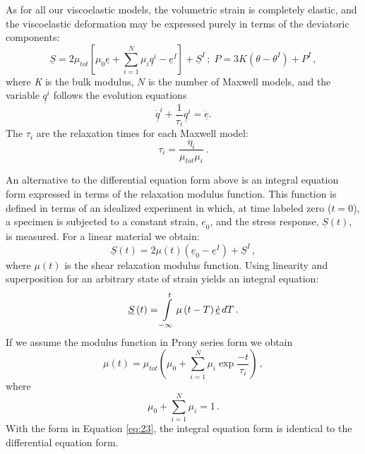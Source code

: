 As for all our viscoelastic models, the volumetric strain is completely
elastic, and the viscoelastic deformation may be expressed purely
in terms of the deviatoric components:
\begin{equation}
\underline{S}=2\mu_{tot}\left[\mu_{0}\underline{e}+\sum_{i=1}^{N}\mu_{i}\underline{q}^{i}-\underline{e}^{I}\right]+\underline{S}^{I}\,;\; P=3K\left(\theta-\theta^{I}\right)+P^{I}\,,\label{eq:19}
\end{equation}
where \textsl{K} is the bulk modulus, $N$ is the number of Maxwell
models, and the variable $\underline{q}^{i}$ follows the evolution
equations
\begin{equation}
\underline{\dot{q}}^{i}+\frac{1}{\tau_{i}}\underline{q}^{i}=\underline{\dot{e}}.\label{eq:20}
\end{equation}
The $\tau_{i}$ are the relaxation times for each Maxwell model:
\begin{equation}
\tau_{i}=\frac{\eta_{i}}{\mu_{tot}\mu_{i}}\:.\label{eq:21-1}
\end{equation}


An alternative to the differential equation form above is an integral
equation form expressed in terms of the relaxation modulus function.
This function is defined in terms of an idealized experiment in which,
at time labeled zero ($t=0$), a specimen is subjected to a constant
strain, $\underline{e}_{0}$, and the stress response, $\underline{S}\left(t\right)$,
is measured. For a linear material we obtain:
\begin{equation}
\underline{S}\left(t\right)=2\mu\left(t\right)\left(\underline{e}_{0}-\underline{e}^{I}\right)+\underline{S}^{I}\,,\label{eq:21}
\end{equation}
where $\mu\left(t\right)$ is the shear relaxation modulus function.
Using linearity and superposition for an arbitrary state of strain
yields an integral equation:
\begin{equation}
\underline{S}\left(t\right)=\intop_{-\infty}^{t}\mu\left(t-T\right)\underline{\dot{e}}\, dT\,.\label{eq:22}
\end{equation}
If we assume the modulus function in Prony series form we obtain
\begin{equation}
\mu\left(t\right)=\mu_{tot}\left(\mu_{0}+\sum_{i=1}^{N}\mu_{i}\exp\frac{-t}{\tau_{i}}\right)\,,\label{eq:23}
\end{equation}
where
\begin{equation}
\mu_{0}+\sum_{i=1}^{N}\mu_{i}=1\,.\label{eq:24}
\end{equation}
With the form in Equation \vref{eq:23}, the integral equation form
is identical to the differential equation form.

